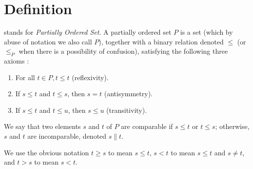 \section{Definition}

 stands for \emph{Partially Ordered Set}. A partially ordered set $P$ is a set (which by abuse of notation we also call $P$), together with a binary relation denoted $\leq$ (or $\leq_P$ when there is a possibility of confusion), satisfying the following three axioms \cite{Stanley:2011:ECV:2124415}:

\begin{enumerate}
\item For all $t \in P, t \leq t$ (reflexivity).
\item If $s \leq t$ and $t \leq s$, then $s = t$ (antisymmetry).
\item If $s \leq t$ and $t \leq u$, then $s \leq u$ (transitivity).
\end{enumerate}

We say that two elements $s$ and $t$ of $P$ are comparable if $s \leq t$ or $t \leq s$; otherwise, $s$ and $t$ are incomparable, denoted $s \parallel t$.

We use the obvious notation $t \geq s$ to mean $s \leq t$, $s < t$ to mean $s \leq t$ and $s \neq t$, and $t > s$ to mean $s < t$.
